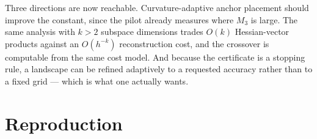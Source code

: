 \documentclass[11pt]{article}
\theoremstyle{definition}
\begin{document}
Three directions are now reachable. Curvature-adaptive anchor placement should improve
the constant, since the pilot already measures where $M_3$ is large. The same analysis
with $k>2$ subspace dimensions trades $O(k)$ Hessian-vector products against an
$O(h^{-k})$ reconstruction cost, and the crossover is computable from the same cost
model. And because the certificate is a stopping rule, a landscape can be refined
adaptively to a requested accuracy rather than to a fixed grid --- which is what one
actually wants.

\FloatBarrier




\appendix
\section{Reproduction}
\label{app:repro}


\end{document}
